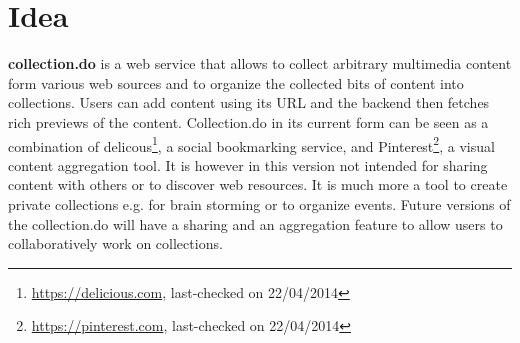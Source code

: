 \section{Idea}

\textbf{collection.do} is a web service that allows to collect arbitrary multimedia content form various web sources and to organize the collected bits of content into collections. Users can add content using its URL and the backend then fetches rich previews of the content. Collection.do in its current form can be seen as a combination of delicous\footnote{\url{https://delicious.com}, last-checked on 22/04/2014}, a social bookmarking service, and Pinterest\footnote{\url{https://pinterest.com}, last-checked on 22/04/2014}, a visual content aggregation tool. It is however in this version not intended for sharing content with others or to discover web resources. It is much more a tool to create private collections e.g. for brain storming or to organize events. Future versions of the collection.do will have a sharing and an aggregation feature to allow users to collaboratively work on collections.